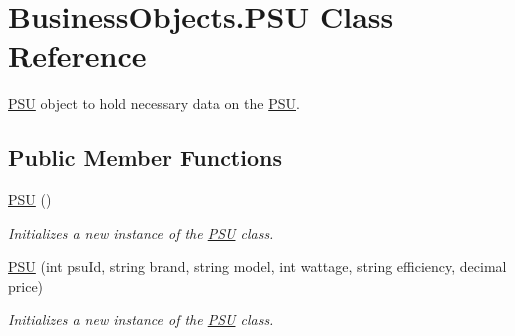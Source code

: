 \hypertarget{class_business_objects_1_1_p_s_u}{}\section{Business\+Objects.\+P\+SU Class Reference}
\label{class_business_objects_1_1_p_s_u}


\hyperlink{class_business_objects_1_1_p_s_u}{P\+SU} object to hold necessary data on the \hyperlink{class_business_objects_1_1_p_s_u}{P\+SU}.  


\subsection*{Public Member Functions}
\begin{DoxyCompactItemize}
\item 
\hyperlink{class_business_objects_1_1_p_s_u_a797da5110778eadc6ae1770b7b6fa1f7}{P\+SU} ()
\begin{DoxyCompactList}\small\item\em Initializes a new instance of the \hyperlink{class_business_objects_1_1_p_s_u}{P\+SU} class. \end{DoxyCompactList}\item 
\hyperlink{class_business_objects_1_1_p_s_u_ae552ae19d45745f5a7b3138e80309fd3}{P\+SU} (int psu\+Id, string brand, string model, int wattage, string efficiency, decimal price)
\begin{DoxyCompactList}\small\item\em Initializes a new instance of the \hyperlink{class_business_objects_1_1_p_s_u}{P\+SU} class. \end{DoxyCompactList}\end{DoxyCompactItemize}
